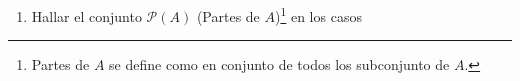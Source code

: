 \documentclass[a4paper,11pt]{article}
\newcommand{\resalta}[1]{\colorbox{g}{$\displaystyle #1$}}
\newlength\dlf
\newcommand\alignedbox[2]{
  &
  \begingroup
  \settowidth\dlf{$\displaystyle #1$}
  \addtolength\dlf{\fboxsep+\fboxrule}
  \hspace{-\dlf}
  \fcolorbox{g}{g}{$\displaystyle #1 #2$}
  \endgroup
}
\newcommand{\corchetes}[1][*]{
   $\{{#1}\}$
}
\begin{document}
\begin{enumerate}
\begin{enumerate}[label = \roman*)]
\begin{minipage}[t]{0.7\linewidth}
{\begin{align*}
                        &= ((A\cap B)\cup(A\cap C)\cup(B\cap C))\cap ((A\cap B)^{c}\cup(A\cap C)^{c}\cup(B\cap C)^{c})\\
                        &= ((A\cap B)\cup(A\cap C)\cup(B\cap C))\cap ((A^{c}\cup B^{c})\cup(A^{c}\cup C^{c})\cup(B^{c}\cup C^{c}))\\
                        \alignedbox{R}{= ((A\cap B)\cup(A\cap C)\cup(B\cap C))\cap(A^{c}\cup B^{c}\cup C^{c})}
                    \end{align*}
                }
            \end{minipage}
        \end{enumerate}
        \item Hallar el conjunto $\mathcal{P}(A)$ (Partes de $A$)\footnote{Partes de $A$ se define como en conjunto de todos los subconjunto de $A$.} en los casos
\end{enumerate}
\end{document}

